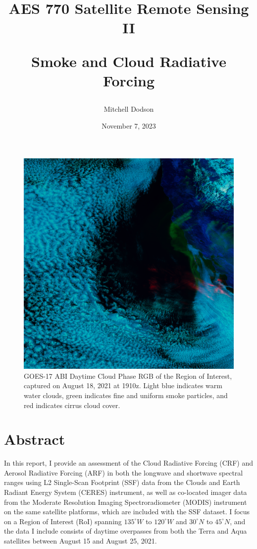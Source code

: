 \documentclass[12pt]{article}
\title{AES 770 Satellite Remote Sensing II

Smoke and Cloud Radiative Forcing}
\author{Mitchell Dodson}
\date{November 7, 2023}
\begin{document}
\maketitle

\vspace{-2em}

\begin{figure}[h!]
    \centering
    \includegraphics[width=.5\paperwidth]{figs/cover.png}
    \caption{GOES-17 ABI Daytime Cloud Phase RGB of the Region of Interest, captured on August 18, 2021 at 1910z. Light blue indicates warm water clouds, green indicates fine and uniform smoke particles, and red indicates cirrus cloud cover.}
    \label{cover}
\end{figure}

\vspace{-1em}

\section{Abstract}

In this report, I provide an assessment of the Cloud Radiative Forcing (CRF) and Aerosol Radiative Forcing (ARF) in both the longwave and shortwave spectral ranges using L2 Single-Scan Footprint (SSF) data from the Clouds and Earth Radiant Energy System (CERES) instrument, as well as co-located imager data from the Moderate Resolution Imaging Spectroradiometer (MODIS) instrument on the same satellite platforms, which are included with the SSF dataset. I focus on a Region of Interest (RoI) spanning $135^\circ W$ to $120^\circ W$ and $30^\circ N$ to $45^\circ N$, and the data I include consists of daytime overpasses from both the Terra and Aqua satellites between August 15 and August 25, 2021.
\end{document}
